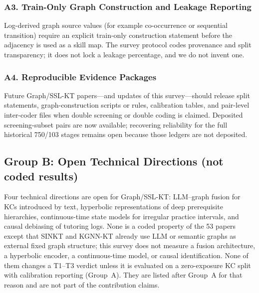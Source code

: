 \documentclass[lettersize,journal]{IEEEtran}
\begin{document}
\subsubsection{A3. Train-Only Graph Construction and Leakage Reporting}
Log-derived graph source values (for example co-occurrence or sequential transition) require an explicit train-only construction statement before the adjacency is used as a skill map. The survey protocol codes provenance and split transparency; it does not lock a leakage percentage, and we do not invent one.

\subsubsection{A4. Reproducible Evidence Packages}
Future Graph/SSL-KT papers---and updates of this survey---should release split statements, graph-construction scripts or rules, calibration tables, and pair-level inter-coder files when double screening or double coding is claimed. Deposited screening-subset pairs are now available; recovering reliability for the full historical 750/103 stages remains open because those ledgers are not deposited.

\subsection{Group B: Open Technical Directions (not coded results)}
Four technical directions are open for Graph/SSL-KT: LLM--graph fusion for KCs introduced by text, hyperbolic representations of deep prerequisite hierarchies, continuous-time state models for irregular practice intervals, and causal debiasing of tutoring logs. None is a coded property of the 53 papers except that SINKT and KGNN-KT already use LLM or semantic graphs as external fixed graph structure; this survey does not measure a fusion architecture, a hyperbolic encoder, a continuous-time model, or causal identification. None of them changes a T1--T3 verdict unless it is evaluated on a zero-exposure KC split with calibration reporting (Group~A). They are listed after Group~A for that reason and are not part of the contribution claims.
\end{document}
